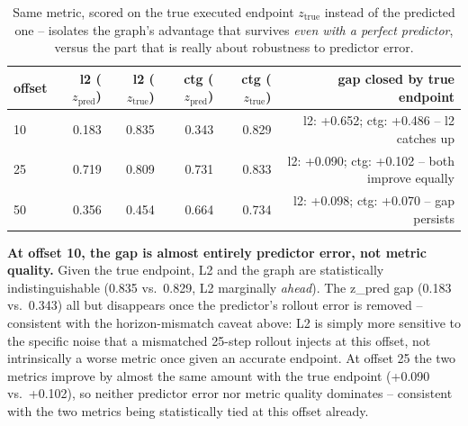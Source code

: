 \documentclass[11pt]{article}
\begin{document}
\begin{table}[H]
\centering\small
\caption{Same metric, scored on the true executed endpoint $z_{\mathrm{true}}$ instead of the
predicted one -- isolates the graph's advantage that survives \emph{even with a perfect
predictor}, versus the part that is really about robustness to predictor error.}
\label{tab:graph-vs-l2-ztrue}
\begin{tabular}{lrrrrr}
\toprule
offset & l2 ($z_{\mathrm{pred}}$) & l2 ($z_{\mathrm{true}}$) & ctg ($z_{\mathrm{pred}}$) & ctg ($z_{\mathrm{true}}$) & gap closed by true endpoint \\
\midrule
10 & 0.183 & 0.835 & 0.343 & 0.829 & l2: +0.652; ctg: +0.486 -- l2 catches up \\
25 & 0.719 & 0.809 & 0.731 & 0.833 & l2: +0.090; ctg: +0.102 -- both improve equally \\
50 & 0.356 & 0.454 & 0.664 & 0.734 & l2: +0.098; ctg: +0.070 -- gap persists \\
\bottomrule
\end{tabular}
\end{table}

\textbf{At offset 10, the gap is almost entirely predictor error, not metric quality.} Given
the true endpoint, L2 and the graph are statistically indistinguishable (0.835 vs.\ 0.829,
L2 marginally \emph{ahead}). The z\_pred gap (0.183 vs.\ 0.343) all but disappears once the
predictor's rollout error is removed -- consistent with the horizon-mismatch caveat above: L2
is simply more sensitive to the specific noise that a mismatched 25-step rollout injects at
this offset, not intrinsically a worse metric once given an accurate endpoint. At offset 25
the two metrics improve by almost the same amount with the true endpoint (+0.090 vs.\
+0.102), so neither predictor error nor metric quality dominates -- consistent with the two
metrics being statistically tied at this offset already.
\end{document}
